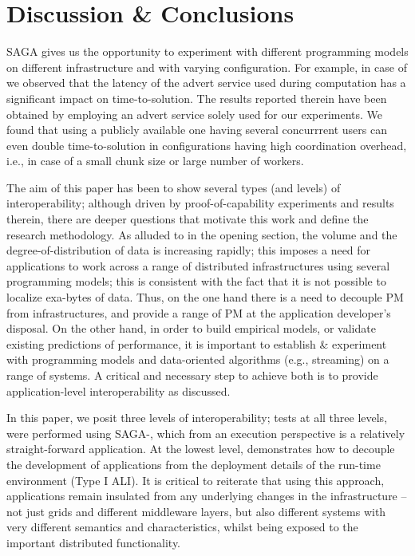 \documentclass[3p,twocolumn]{elsarticle}
\begin{document}
\section{Discussion \& Conclusions}
\label{sec:discuss}

SAGA gives us the opportunity to experiment with different programming
models on different infrastructure and with varying configuration.
For example, in case of \sagamapreduce we observed that the latency of
the advert service used during computation has a significant impact on
time-to-solution. The results reported therein have been obtained by
employing an advert service solely used for our experiments.  We found
that using a publicly available one having several concurrrent users
can even double time-to-solution in configurations having high
coordination overhead, i.e., in case of a small chunk size or large
number of workers.

The aim of this paper has been to show several types (and levels) of
interoperability; although driven by proof-of-capability experiments
and results therein, there are deeper questions that motivate this
work and define the research methodology.  As alluded to in the
opening section, the volume and the degree-of-distribution of data is
increasing rapidly; this imposes a need for applications to work
across a range of distributed infrastructures using several
programming models; this is consistent with the fact that it is not
possible to localize exa-bytes of data.  Thus, on the one hand there
is a need to decouple PM from infrastructures, and provide a range of
PM at the application developer's disposal. On the other hand, in
order to build empirical models, or validate existing predictions of
performance, it is important to establish \& experiment with
programming models and data-oriented algorithms (e.g., streaming) on a
range of systems. %
A critical and necessary step to achieve both is to provide
application-level interoperability as discussed.

In this paper, we posit three levels of interoperability; tests at all
three levels, were performed using SAGA-\mr, which from an execution
perspective is a relatively straight-forward application.  At the
lowest level, \sagamapreduce demonstrates how to decouple the
development of applications from the deployment details of the
run-time environment (Type I ALI).  It is critical to reiterate that
using this approach, applications remain insulated from any underlying
changes in the infrastructure -- not just grids and different
middleware layers, but also different systems with very different
semantics and characteristics, whilst being exposed to the important
distributed functionality.
\end{document}
